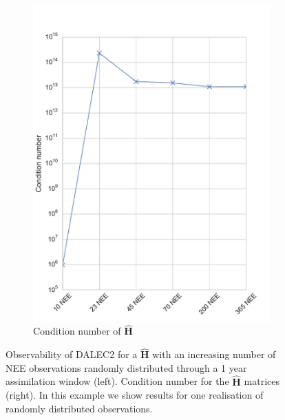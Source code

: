 \begin{figure}[ht]
\begin{subfigure}[b]{0.4\textwidth}
        \includegraphics[width=\textwidth]{chapter/chapter5/dalec2_obsrankcondwind.pdf}
        \caption{Condition number of $\hat{\textbf{H}}$}
        \label{chap5:fig:D2_observabilitycondwind}
    \end{subfigure}
    \caption{Observability of DALEC2 for a $\hat{\textbf{H}}$ with an increasing number of NEE observations randomly distributed through a 1 year assimilation window (left). Condition number for the $\hat{\textbf{H}}$ matrices (right). In this example we show results for one realisation of randomly distributed observations.}
    \label{chap5:fig:D2_observabilitywind}
\end{figure}

